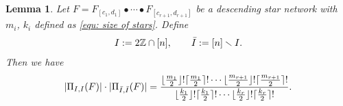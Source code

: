 \documentclass[12pt]{amsart}
\newtheorem{lem}[thm]{Lemma}
\theoremstyle{definition}
\numberwithin{equation}{section}
\newcommand{\defeq}{:=}
\newcommand{\ssm}{\smallsetminus}
\begin{document}
\begin{lem}\label{eq:counting odd-evens} Let $F = F_{[c_1,d_1]} \bullet \cdots \bullet F_{[c_{r+1},d_{r+1}]}$ be a descending star network with $m_i$, $k_i$ defined as \eqref{equ: size of stars}. Define
\begin{equation*}
\begin{gathered}
I \defeq 2\mathbb Z \cap [n], \qquad \Bar I \defeq [n] \ssm I.
\end{gathered}
\end{equation*}
Then we have
\begin{equation}\label{eq:evenoddfraction}
    |\Pi_{I,I}(F)| \cdot |\Pi_{\Bar I, \Bar I}(F)| = \frac{\lfloor \frac{m_1}{2}\rfloor!\lceil \frac{m_1}{2}\rceil!\cdots \lfloor \frac{m_{r+1}}{2}\rfloor!\lceil\frac{m_{r+1}}{2}\rceil!}{\lfloor \frac{k_1}{2}\rfloor!\lceil \frac{k_1}{2}\rceil!\cdots \lfloor \frac{k_{r}}{2}\rfloor!\lceil\frac{k_{r}}{2}\rceil!}.
\end{equation}
\end{lem}
\end{document}
